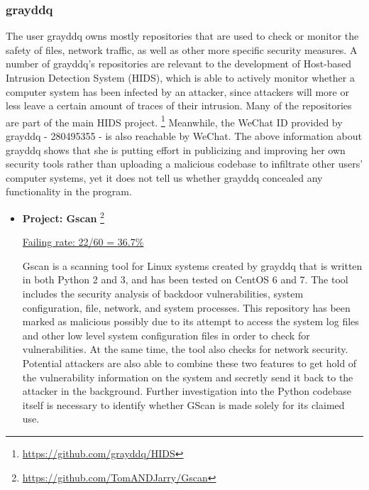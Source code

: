 \documentclass[]{acmart}
\begin{document}
\subsubsection{grayddq}
The user grayddq owns mostly repositories that are used to check or monitor the safety of files, network traffic, as well as other more specific security measures. A number of grayddq's repositories are relevant to the development of Host-based Intrusion Detection System (HIDS), which is able to actively monitor whether a computer system has been infected by an attacker, since attackers will more or less leave a certain amount of traces of their intrusion. Many of the repositories are part of the main HIDS project. \footnote{\url{https://github.com/grayddq/HIDS}} Meanwhile, the WeChat ID provided by grayddq - 280495355 - is also reachable by WeChat. The above information about grayddq shows that she is putting effort in publicizing and improving her own security tools rather than uploading a malicious codebase to infiltrate other users' computer systems, yet it does not tell us whether grayddq concealed any functionality in the program. 
\begin{itemize}
    \item { \bf Project: Gscan }\footnote{\url{https://github.com/TomANDJarry/Gscan}}
    
    \underline{ Failing rate: 22/60 = 36.7\% }
    
    Gscan is a scanning tool for Linux systems created by grayddq that is written in both Python 2 and 3, and has been tested on CentOS 6 and 7. The tool includes the security analysis of backdoor vulnerabilities, system configuration, file, network, and system processes. This repository has been marked as malicious possibly due to its attempt to access the system log files and other low level system configuration files in order to check for vulnerabilities. At the same time, the tool also checks for network security. Potential attackers are also able to combine these two features to get hold of the vulnerability information on the system and secretly send it back to the attacker in the background. Further investigation into the Python codebase itself is necessary to identify whether GScan is made solely for its claimed use. 
\end{itemize}
\end{document}
